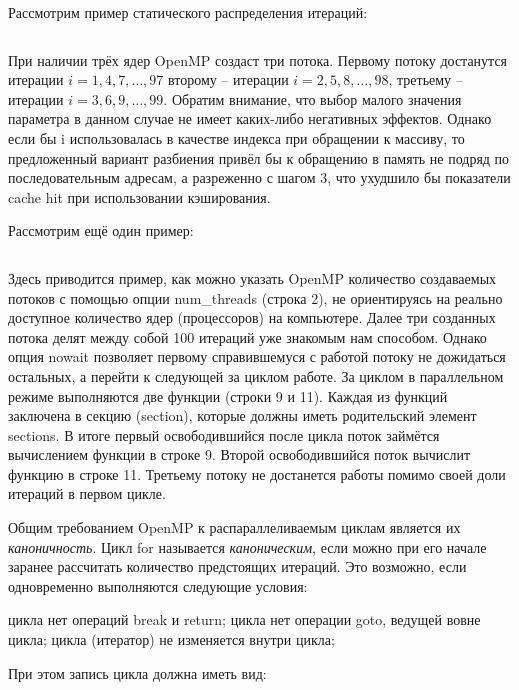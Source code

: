 Рассмотрим пример статического распределения итераций:

\inputminted{c++}{listings/OpenMPExample13.cpp}

При наличии трёх ядер OpenMP создаст три потока. Первому потоку достанутся итерации\; $i=1, 4, 7, \dots, 97$ второму -- итерации\; $i=2, 5, 8, \dots, 98$, третьему -- итерации\; $i=3, 6, 9, \dots, 99$. Обратим внимание, что выбор малого значения параметра  в данном случае не имеет каких-либо негативных эффектов. Однако если бы i использовалась в качестве индекса при обращении к массиву, то предложенный вариант разбиения привёл бы к обращению в память не подряд по последовательным адресам, а разреженно с шагом 3, что ухудшило бы показатели cache hit при использовании кэширования.

Рассмотрим ещё один пример: 

\inputminted{c++}{listings/OpenMPExample14.cpp}

Здесь приводится пример, как можно указать OpenMP количество создаваемых потоков с помощью опции num\_threads (строка 2), не ориентируясь на реально доступное количество ядер (процессоров) на компьютере. Далее три созданных потока делят между собой 100 итераций уже знакомым нам способом. Однако опция nowait позволяет первому справившемуся с работой потоку не дожидаться остальных, а перейти к следующей за циклом работе. За циклом в параллельном режиме выполняются две функции (строки 9 и 11). Каждая из функций заключена в секцию (section), которые должны иметь родительский элемент sections. В итоге первый освободившийся после цикла поток займётся вычислением функции в строке 9. Второй освободившийся поток вычислит функцию в строке 11. Третьему потоку не достанется работы помимо своей доли итераций в первом цикле.

Общим требованием OpenMP к распараллеливаемым циклам является их \textit{каноничность}. Цикл for называется \textit{каноническим}, если можно при его начале заранее рассчитать количество предстоящих итераций. Это возможно, если одновременно выполняются следующие условия:

\begin{itemize}
     цикла нет операций break и return;
     цикла нет операции goto, ведущей вовне цикла;
     цикла (итератор) не изменяется внутри цикла;
\end{itemize}

При этом запись цикла должна иметь вид: 

